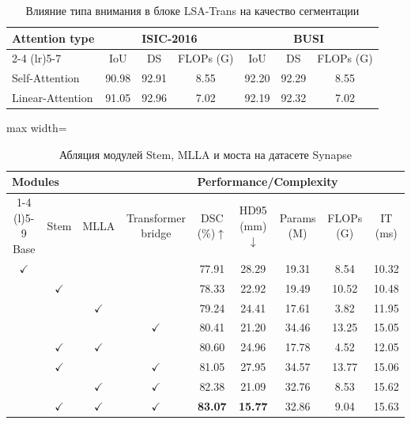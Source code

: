 \documentclass[areasetadvanced]{scrartcl}
\begin{document}
		\begin{table}[H]
			\centering
			\footnotesize
			\caption{Влияние типа внимания в блоке LSA-Trans на качество сегментации \cite{cltmambaseg}}
			\label{tab:clt8}
			\begin{tabular}{lcccccc}
				\toprule
				\multirow{2}{*}{Attention type} & \multicolumn{3}{c}{ISIC-2016} & \multicolumn{3}{c}{BUSI} \\
				\cmidrule(lr){2-4} \cmidrule(lr){5-7}
				 & IoU & DS & FLOPs (G) & IoU & DS & FLOPs (G) \\
				\midrule
				Self-Attention & 90.98 & 92.91 & 8.55 & 92.20 & 92.29 & 8.55 \\
				Linear-Attention & 91.05 & 92.96 & 7.02 & 92.19 & 92.32 & 7.02 \\
				\bottomrule
			\end{tabular}
		\end{table}

		\begin{table}[H]
			\centering
			\footnotesize
			\caption{Абляция модулей Stem, MLLA и моста на датасете Synapse \cite{mlformer}}
			\label{tab:mlformerabl}
			\setlength{\tabcolsep}{4pt}
			\begin{adjustbox}{max width=\linewidth}
			\begin{tabular}{ccccccccc}
				\toprule
				\multicolumn{4}{l}{Modules} & \multicolumn{5}{l}{Performance/Complexity} \\
				\cmidrule(r){1-4} \cmidrule(l){5-9}
				Base & Stem & MLLA & Transformer bridge & DSC (\%)$\uparrow$ & HD95 (mm)$\downarrow$ & Params (M) & FLOPs (G) & IT (ms) \\
				\midrule
				$\checkmark$ & & & & 77.91 & 28.29 & 19.31 & 8.54 & 10.32 \\
				 & $\checkmark$ & & & 78.33 & 22.92 & 19.49 & 10.52 & 10.48 \\
				 & & $\checkmark$ & & 79.24 & 24.41 & 17.61 & 3.82 & 11.95 \\
				 & & & $\checkmark$ & 80.41 & 21.20 & 34.46 & 13.25 & 15.05 \\
				 & $\checkmark$ & $\checkmark$ & & 80.60 & 24.96 & 17.78 & 4.52 & 12.05 \\
				 & $\checkmark$ & & $\checkmark$ & 81.05 & 27.95 & 34.57 & 13.77 & 15.06 \\
				 & & $\checkmark$ & $\checkmark$ & 82.38 & 21.09 & 32.76 & 8.53 & 15.62 \\
				 & $\checkmark$ & $\checkmark$ & $\checkmark$ & \textbf{83.07} & \textbf{15.77} & 32.86 & 9.04 & 15.63 \\
				\bottomrule
			\end{tabular}
			\end{adjustbox}
		\end{table}
\end{document}
